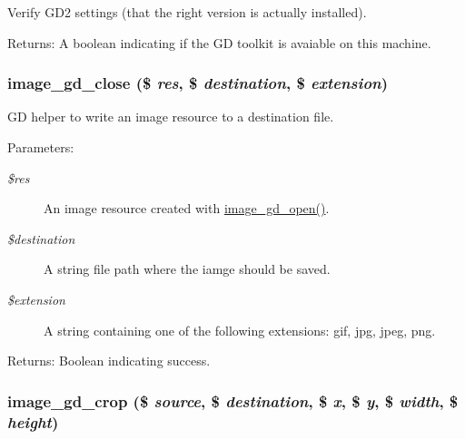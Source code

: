 Verify GD2 settings (that the right version is actually installed).

\begin{Desc}
\item[Returns:]A boolean indicating if the GD toolkit is avaiable on this machine. \end{Desc}
\hypertarget{group__image_ga23594d3a02ab3e49647cb33f1e8590f}{
\subsubsection[{image\_\-gd\_\-close}]{\setlength{\rightskip}{0pt plus 5cm}image\_\-gd\_\-close (\$ {\em res}, \/  \$ {\em destination}, \/  \$ {\em extension})}}
\label{group__image_ga23594d3a02ab3e49647cb33f1e8590f}


GD helper to write an image resource to a destination file.

\begin{Desc}
\item[Parameters:]
\begin{description}
\item[{\em \$res}]An image resource created with \hyperlink{group__image_gbb45a7fb30f1066896d524d9b4069622}{image\_\-gd\_\-open()}. \item[{\em \$destination}]A string file path where the iamge should be saved. \item[{\em \$extension}]A string containing one of the following extensions: gif, jpg, jpeg, png. \end{description}
\end{Desc}
\begin{Desc}
\item[Returns:]Boolean indicating success. \end{Desc}
\hypertarget{group__image_gcebe63cdcfcb41f3896fc16a128dde75}{
\subsubsection[{image\_\-gd\_\-crop}]{\setlength{\rightskip}{0pt plus 5cm}image\_\-gd\_\-crop (\$ {\em source}, \/  \$ {\em destination}, \/  \$ {\em x}, \/  \$ {\em y}, \/  \$ {\em width}, \/  \$ {\em height})}}
\label{group__image_gcebe63cdcfcb41f3896fc16a128dde75}


